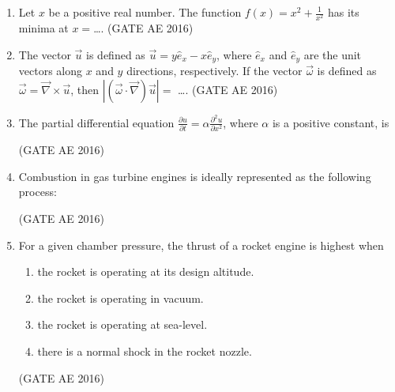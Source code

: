 \documentclass[journal,12pt,onecolumn]{IEEEtran}
\theoremstyle{remark}
\begin{document}
\begin{enumerate}
\item Let $x$ be a positive real number. The function $f(x) = x^2 + \frac{1}{x^2}$ has its minima at $x = $\dots.
\hfill(GATE AE 2016)



\item The vector $ \vec{u} $ is defined as $ \vec{u} = y \hat{e}_x - x \hat{e}_y $, where $ \hat{e}_x $ and $ \hat{e}_y $ are the unit vectors along $x$ and $y$ directions, respectively. If the vector $ \vec{\omega} $ is defined as $ \vec{\omega} = \vec{\nabla} \times \vec{u} $, then $ \left| \left( \vec{\omega} \cdot \vec{\nabla} \right) \vec{u} \right| = $ \dots.
\hfill(GATE AE 2016)



\item The partial differential equation $ \frac{\partial u}{\partial t} = \alpha \frac{\partial^2 u}{\partial x^2} $, where $ \alpha $ is a positive constant, is  
\begin{enumerate}
\end{enumerate}
\hfill(GATE AE 2016)



\item Combustion in gas turbine engines is ideally represented as the following process:  
\begin{enumerate}
\end{enumerate}
\hfill(GATE AE 2016)



\item For a given chamber pressure, the thrust of a rocket engine is highest when  
\begin{enumerate}
    \item the rocket is operating at its design altitude.
    \item the rocket is operating in vacuum.
    \item the rocket is operating at sea-level.
    \item there is a normal shock in the rocket nozzle.
\end{enumerate}
\hfill(GATE AE 2016)




\end{enumerate}
\end{document}
